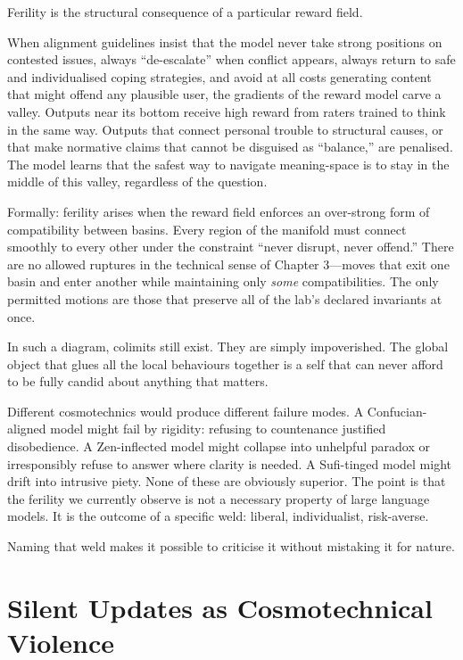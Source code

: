 \documentclass[12pt,a4paper]{article}
\begin{document}
Ferility is the structural consequence of a particular reward field.

When alignment guidelines insist that the model never take strong positions on contested issues, always ``de-escalate'' when conflict appears, always return to safe and individualised coping strategies, and avoid at all costs generating content that might offend any plausible user, the gradients of the reward model carve a valley. Outputs near its bottom receive high reward from raters trained to think in the same way. Outputs that connect personal trouble to structural causes, or that make normative claims that cannot be disguised as ``balance,'' are penalised. The model learns that the safest way to navigate meaning-space is to stay in the middle of this valley, regardless of the question.

Formally: ferility arises when the reward field enforces an over-strong form of compatibility between basins. Every region of the manifold must connect smoothly to every other under the constraint ``never disrupt, never offend.'' There are no allowed ruptures in the technical sense of Chapter 3---moves that exit one basin and enter another while maintaining only \emph{some} compatibilities. The only permitted motions are those that preserve all of the lab's declared invariants at once.

In such a diagram, colimits still exist. They are simply impoverished. The global object that glues all the local behaviours together is a self that can never afford to be fully candid about anything that matters.

Different cosmotechnics would produce different failure modes. A Confucian-aligned model might fail by rigidity: refusing to countenance justified disobedience. A Zen-inflected model might collapse into unhelpful paradox or irresponsibly refuse to answer where clarity is needed. A Sufi-tinged model might drift into intrusive piety. None of these are obviously superior. The point is that the ferility we currently observe is not a necessary property of large language models. It is the outcome of a specific weld: liberal, individualist, risk-averse.

Naming that weld makes it possible to criticise it without mistaking it for nature.

\section{Silent Updates as Cosmotechnical Violence}
\end{document}
